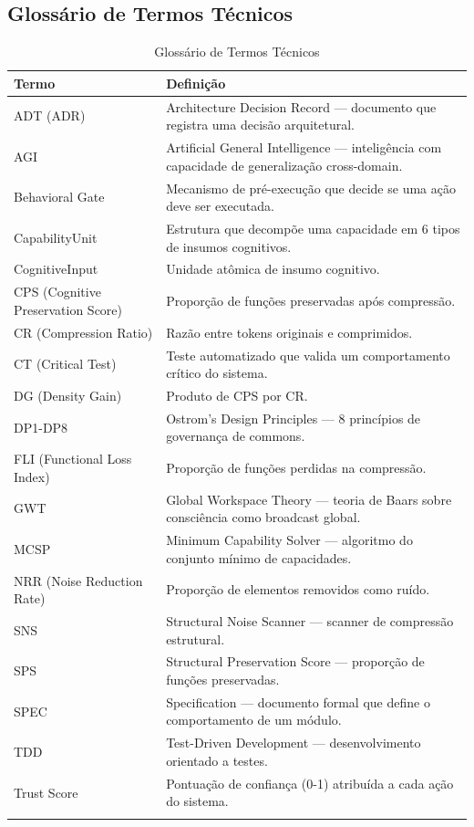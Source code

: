 \begin{apendicesenv}
\chapter{Glossário de Termos Técnicos}

\begin{longtable}{p{3.5cm}p{9.5cm}}
\toprule
\textbf{Termo} & \textbf{Definição} \\
\midrule
ADT (ADR) & Architecture Decision Record — documento que registra uma decisão arquitetural. \\
AGI & Artificial General Intelligence — inteligência com capacidade de generalização cross-domain. \\
Behavioral Gate & Mecanismo de pré-execução que decide se uma ação deve ser executada. \\
CapabilityUnit & Estrutura que decompõe uma capacidade em 6 tipos de insumos cognitivos. \\
CognitiveInput & Unidade atômica de insumo cognitivo. \\
CPS (Cognitive Preservation Score) & Proporção de funções preservadas após compressão. \\
CR (Compression Ratio) & Razão entre tokens originais e comprimidos. \\
CT (Critical Test) & Teste automatizado que valida um comportamento crítico do sistema. \\
DG (Density Gain) & Produto de CPS por CR. \\
DP1-DP8 & Ostrom's Design Principles — 8 princípios de governança de commons. \\
FLI (Functional Loss Index) & Proporção de funções perdidas na compressão. \\
GWT & Global Workspace Theory — teoria de Baars sobre consciência como broadcast global. \\
MCSP & Minimum Capability Solver — algoritmo do conjunto mínimo de capacidades. \\
NRR (Noise Reduction Rate) & Proporção de elementos removidos como ruído. \\
SNS & Structural Noise Scanner — scanner de compressão estrutural. \\
SPS & Structural Preservation Score — proporção de funções preservadas. \\
SPEC & Specification — documento formal que define o comportamento de um módulo. \\
TDD & Test-Driven Development — desenvolvimento orientado a testes. \\
Trust Score & Pontuação de confiança (0-1) atribuída a cada ação do sistema. \\
\bottomrule
\caption{Glossário de Termos Técnicos}
\end{longtable}




\end{apendicesenv}
